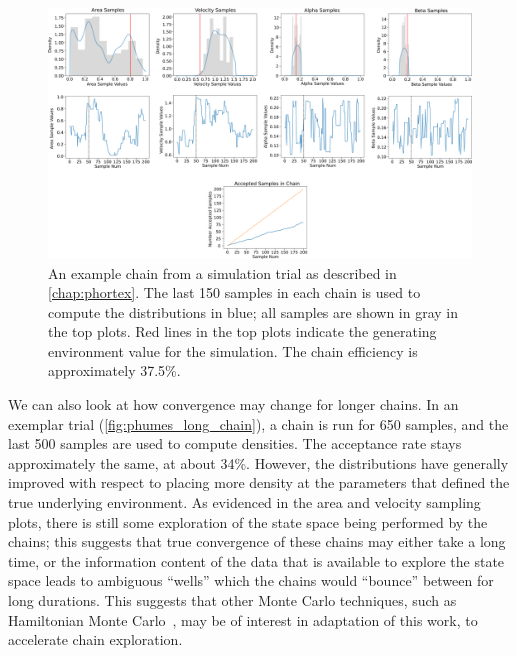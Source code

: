 \begin{figure}[h!]
    \centering
    \includegraphics[width=1\columnwidth]{figures/phumes_trial_chain.png}
    \caption[\PHUMES simulation chain]{An example chain from a simulation trial as described in \cref{chap:phortex}. The last 150 samples in each chain is used to compute the distributions in blue; all samples are shown in gray in the top plots. Red lines in the top plots indicate the generating environment value for the simulation. The chain efficiency is approximately 37.5\%.}
    \label{fig:phumes_sim_chain}
\end{figure}

We can also look at how convergence may change for longer chains. In an exemplar trial (\cref{fig:phumes_long_chain}), a chain is run for 650 samples, and the last 500 samples are used to compute densities. The acceptance rate stays approximately the same, at about 34\%. However, the distributions have generally improved with respect to placing more density at the parameters that defined the true underlying environment. As evidenced in the area and velocity sampling plots, there is still some exploration of the state space being performed by the chains; this suggests that true convergence of these chains may either take a long time, or the information content of the data that is available to explore the state space leads to ambiguous ``wells'' which the chains would ``bounce'' between for long durations. This suggests that other Monte Carlo techniques, such as Hamiltonian Monte Carlo~\autocite{duane1987hybrid}, may be of interest in adaptation of this work, to accelerate chain exploration.

